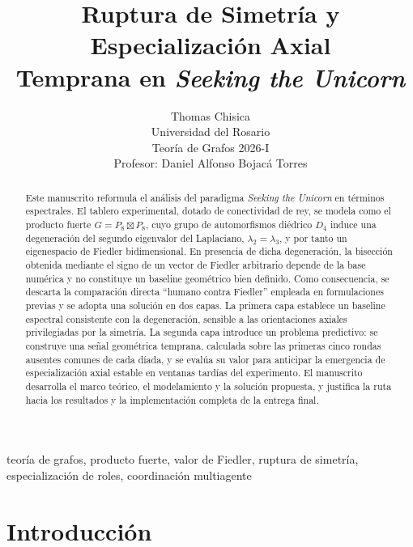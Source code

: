 \documentclass[journal]{IEEEtran}
\begin{document}
\pagestyle{empty}

\title{Ruptura de Simetría y Especialización Axial\\Temprana en \emph{Seeking the Unicorn}}

\author{Thomas Chisica\\
Universidad del Rosario\\
Teoría de Grafos 2026-I\\
Profesor: Daniel Alfonso Bojacá Torres}

\maketitle

\begin{abstract}
Este manuscrito reformula el análisis del paradigma \emph{Seeking the Unicorn} en términos espectrales. El tablero experimental, dotado de conectividad de rey, se modela como el producto fuerte $G = P_8 \boxtimes P_8$, cuyo grupo de automorfismos diédrico $D_4$ induce una degeneración del segundo eigenvalor del Laplaciano, $\lambda_2 = \lambda_3$, y por tanto un eigenespacio de Fiedler bidimensional. En presencia de dicha degeneración, la bisección obtenida mediante el signo de un vector de Fiedler arbitrario depende de la base numérica y no constituye un baseline geométrico bien definido. Como consecuencia, se descarta la comparación directa ``humano contra Fiedler'' empleada en formulaciones previas y se adopta una solución en dos capas. La primera capa establece un baseline espectral consistente con la degeneración, sensible a las orientaciones axiales privilegiadas por la simetría. La segunda capa introduce un problema predictivo: se construye una señal geométrica temprana, calculada sobre las primeras cinco rondas ausentes comunes de cada díada, y se evalúa su valor para anticipar la emergencia de especialización axial estable en ventanas tardías del experimento. El manuscrito desarrolla el marco teórico, el modelamiento y la solución propuesta, y justifica la ruta hacia los resultados y la implementación completa de la entrega final.
\end{abstract}

\begin{IEEEkeywords}
teoría de grafos, producto fuerte, valor de Fiedler, ruptura de simetría, especialización de roles, coordinación multiagente
\end{IEEEkeywords}

\section{Introducción}
\end{document}
